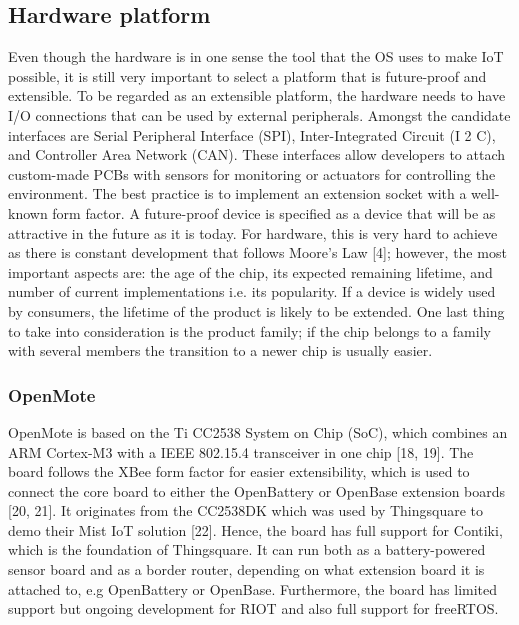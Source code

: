 \subsection{Hardware platform}

Even though the hardware is in one sense the tool that the OS uses to make IoT possible,
	it is still very important to select a platform that is future-proof and extensible.
To be regarded as an extensible platform,
	the hardware needs to have I/O connections that can be used by external peripherals.
Amongst the candidate interfaces are Serial Peripheral Interface (SPI),
	Inter-Integrated Circuit (I 2 C),
	and Controller Area Network (CAN).
These interfaces allow developers to attach custom-made PCBs with sensors for monitoring or actuators for controlling the environment.
The best practice is to implement an extension socket with a well-known form factor.
A future-proof device is specified as a device that will be as attractive in the future as it is today.
For hardware,
	this is very hard to achieve as there is constant development that follows Moore’s Law [4];
	however,
	the most important aspects are:
	the age of the chip,
	its expected remaining lifetime,
	and number of current implementations i.e.
its popularity.
If a device is widely used by consumers,
	the lifetime of the product is likely to be extended.
One last thing to take into consideration is the product family;
	if the chip belongs to a family with several members the transition to a newer chip is usually easier.

\subsubsection{OpenMote}

OpenMote is based on the Ti CC2538 System on Chip (SoC),
	which combines an ARM Cortex-M3 with a IEEE 802.15.4 transceiver in one chip [18, 19].
The board follows the XBee form factor for easier extensibility,
	which is used to connect the core board to either the OpenBattery or OpenBase extension boards [20, 21].
It originates from the CC2538DK which was used by Thingsquare to demo their Mist IoT solution [22].
Hence,
	the board has full support for Contiki,
	which is the foundation of Thingsquare.
It can run both as a battery-powered sensor board and as a border router,
	depending on what extension board it is attached to,
	e.g OpenBattery or OpenBase.
Furthermore,
	the board has limited support but ongoing development for RIOT and also full support for freeRTOS.

